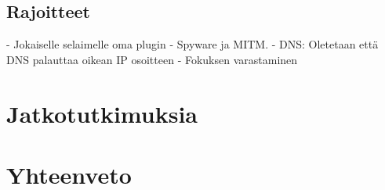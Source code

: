 \documentclass{tktltiki}
\begin{document}
\subsection{Rajoitteet}
 - Jokaiselle selaimelle oma plugin
 - Spyware ja MITM. 
 - DNS: Oletetaan että DNS palauttaa oikean IP osoitteen
 - Fokuksen varastaminen
 
%   
%   
  
  
\section{Jatkotutkimuksia}
\section{Yhteenveto}





\lastpage
\end{document}
